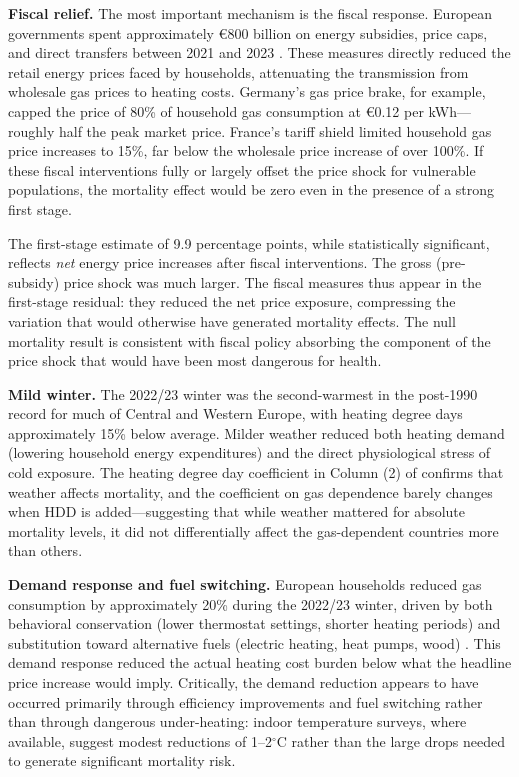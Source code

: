 \documentclass[12pt]{article}
\begin{document}
\textbf{Fiscal relief.} The most important mechanism is the fiscal response. European governments spent approximately \euro 800 billion on energy subsidies, price caps, and direct transfers between 2021 and 2023 \citep{bruegel2023}. These measures directly reduced the retail energy prices faced by households, attenuating the transmission from wholesale gas prices to heating costs. Germany's gas price brake, for example, capped the price of 80\% of household gas consumption at \euro 0.12 per kWh---roughly half the peak market price. France's tariff shield limited household gas price increases to 15\%, far below the wholesale price increase of over 100\%. If these fiscal interventions fully or largely offset the price shock for vulnerable populations, the mortality effect would be zero even in the presence of a strong first stage.

The first-stage estimate of 9.9 percentage points, while statistically significant, reflects \textit{net} energy price increases after fiscal interventions. The gross (pre-subsidy) price shock was much larger. The fiscal measures thus appear in the first-stage residual: they reduced the net price exposure, compressing the variation that would otherwise have generated mortality effects. The null mortality result is consistent with fiscal policy absorbing the component of the price shock that would have been most dangerous for health.

\textbf{Mild winter.} The 2022/23 winter was the second-warmest in the post-1990 record for much of Central and Western Europe, with heating degree days approximately 15\% below average. Milder weather reduced both heating demand (lowering household energy expenditures) and the direct physiological stress of cold exposure. The heating degree day coefficient in Column (2) of  confirms that weather affects mortality, and the coefficient on gas dependence barely changes when HDD is added---suggesting that while weather mattered for absolute mortality levels, it did not differentially affect the gas-dependent countries more than others.

\textbf{Demand response and fuel switching.} European households reduced gas consumption by approximately 20\% during the 2022/23 winter, driven by both behavioral conservation (lower thermostat settings, shorter heating periods) and substitution toward alternative fuels (electric heating, heat pumps, wood) \citep{ruhnau2023}. This demand response reduced the actual heating cost burden below what the headline price increase would imply. Critically, the demand reduction appears to have occurred primarily through efficiency improvements and fuel switching rather than through dangerous under-heating: indoor temperature surveys, where available, suggest modest reductions of 1--2$^{\circ}$C rather than the large drops needed to generate significant mortality risk.
\end{document}
